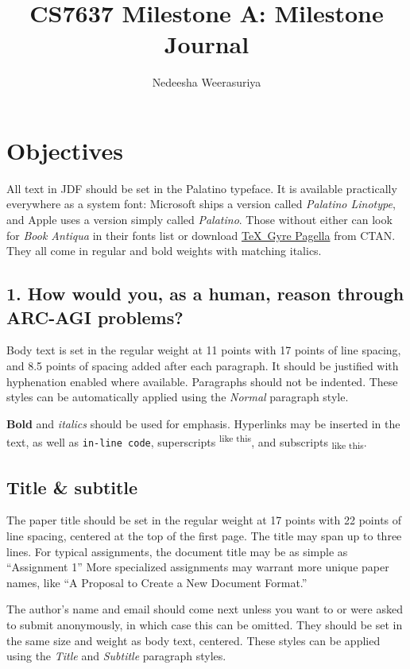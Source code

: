 \documentclass[
	letterpaper, %
]{jdf}
\author{Nedeesha Weerasuriya}
\title{CS7637 Milestone A: Milestone Journal}
\begin{document}

\maketitle


\section{Objectives}
All text in JDF should be set in the Palatino typeface. It is available practically everywhere as a system font: Microsoft ships a version called \emph{Palatino Linotype}, and Apple uses a version simply called \emph{Palatino}. Those without either can look for \emph{Book Antiqua} in their fonts list or download \href{https://www.ctan.org/tex-archive/fonts/tex-gyre/opentype}{\TeX\ Gyre Pagella} from CTAN. They all come in regular and bold weights with matching italics.

\subsection{1. How would you, as a human, reason through ARC-AGI problems?}
Body text is set in the regular weight at 11 points with 17 points of line spacing, and 8.5 points of spacing added after each paragraph. It should be justified with hyphenation enabled where available. Paragraphs should not be indented. These styles can be automatically applied using the \emph{Normal} paragraph style.

\textbf{Bold} and \textit{italics} should be used for emphasis. Hyperlinks may be inserted in the text, as well as {\tt in-line code}, superscripts\textsuperscript{ like this}, and subscripts\textsubscript{ like this}.

\subsection{Title \& subtitle}
The paper title should be set in the regular weight at 17 points with 22 points of line spacing, centered at the top of the first page. The title may span up to three lines. For typical assignments, the document title may be as simple as “Assignment 1” More specialized assignments may warrant more unique paper names, like “A Proposal to Create a New Document Format.”

The author’s name and email should come next unless you want to or were asked to submit anonymously, in which case this can be omitted. They should be set in the same size and weight as body text, centered. These styles can be applied using the \emph{Title} and \emph{Subtitle} paragraph styles.
\end{document}
